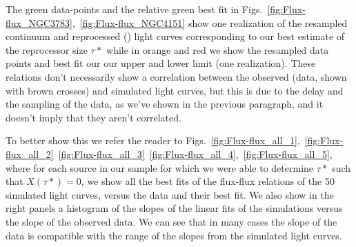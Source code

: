The green data-points and the relative green best fit in Figs.~\ref{fig:Flux-flux_NGC3783},~\ref{fig:Flux-flux_NGC4151} show one realization of the resampled continuum and reprocessed (\kalfa{}) light curves corresponding to our best estimate of the reprocessor size $\tau*$ while in orange and red we show the resampled data points and best fit our our upper and lower limit (one realization). These relations don't necessarily show a correlation between the observed (data, shown with brown crosses) and simulated light curves, but this is due to the delay and the sampling of the data, as we've shown in the previous paragraph, and it doesn't imply that they aren't correlated.

To better show this we refer the reader to Figs.~\ref{fig:Flux-flux_all_1},~\ref{fig:Flux-flux_all_2}~\ref{fig:Flux-flux_all_3}~\ref{fig:Flux-flux_all_4},~\ref{fig:Flux-flux_all_5}, where for each source in our sample for which we were able to determine $\tau*$ such that $X(\tau*)=0$, we show all the best fits of the flux-flux relations of the 50 simulated light curves, versus the data and their best fit. We also show in the right panels a histogram of the slopes of the linear fits of the simulations versus the slope of the observed data. We can see that in many cases the slope of the data is compatible with the range of the slopes from the simulated light curves.

